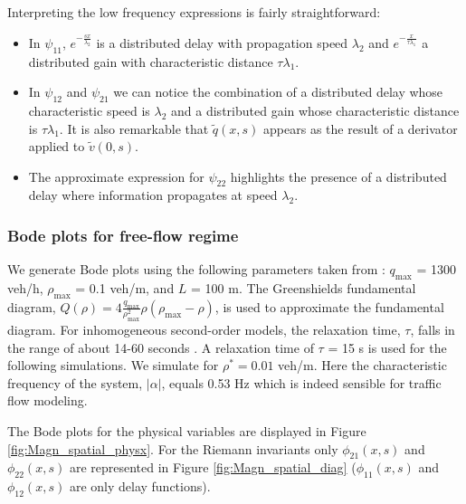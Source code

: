 \documentclass[preprint]{elsarticle}
\begin{document}
Interpreting the low frequency expressions is fairly straightforward:
\begin{itemize}
\item In $\psi_{11}$, $e^{-\frac{sx}{\lambda_{2}}}$ is a distributed delay with propagation speed $\lambda_{2}$ and $e^{-\frac{x}{\tau\lambda_{1}}}$ a distributed gain with characteristic distance $\tau\lambda_{1}$.
\item In $\psi_{12}$ and $\psi_{21}$ we can notice the combination of a distributed delay whose  characteristic speed is $\lambda_{2}$ and a distributed gain whose characteristic distance is $\tau\lambda_{1}$. It is also remarkable that $\widetilde{q}(x,s)$ appears as the result of a derivator applied to $\widetilde{v}(0,s)$.
\item The approximate expression for $\psi_{22}$ highlights the presence of a distributed delay where information propagates at speed $\lambda_{2}$.
\end{itemize}

\subsubsection{Bode plots for free-flow regime}

We generate Bode plots using the following parameters taken from \cite{Hofleitner}: $q_{\text{max}}$ = 1300 veh/h, $\rho_{\text{max}}$ = 0.1 veh/m, and $L$ = 100 m. The Greenshields fundamental diagram, $Q( \rho) = 4 \frac{q_{\text{max}}}{\rho_{\text{max}}^2}\rho (\rho_{\text{max}} - \rho)$, is used to approximate the fundamental diagram. For inhomogeneous second-order models, the relaxation time, $\tau$, falls in the range of about 14-60 seconds \cite{Fan}. A relaxation time of $\tau$ = 15 s is used for the following simulations. We simulate for $\rho^* = 0.01$ veh/m. Here the characteristic frequency of the system, $\left|\alpha\right|$, equals 0.53 Hz which is indeed sensible for traffic flow modeling.

The Bode plots for the physical variables are displayed in Figure \ref{fig:Magn_spatial_physx}.
For the Riemann invariants only $\phi_{21}(x,s)$ and $\phi_{22}(x,s)$ are represented in Figure \ref{fig:Magn_spatial_diag} ($\phi_{11}(x,s)$ and $\phi_{12}(x,s)$ are only delay functions).
\end{document}
